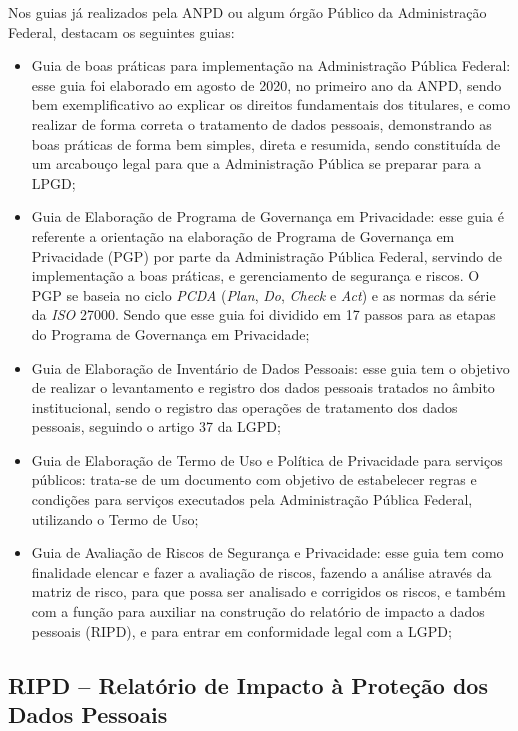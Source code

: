\documentclass[
	12pt,				%
	openright,			%
	oneside,			%
	a4paper,			%
	english,			%
	french,				%
	spanish,			%
	brazil,				%
	]{abntex2}
\begin{document}
Nos guias já realizados pela ANPD ou algum órgão Público da Administração Federal, destacam os seguintes guias:
\begin{itemize}
\item Guia de boas práticas para implementação na Administração Pública Federal: esse guia foi elaborado em agosto de 2020, no primeiro ano da ANPD, sendo bem exemplificativo ao explicar os direitos fundamentais dos titulares, e como realizar de forma correta o tratamento de dados pessoais, demonstrando as boas práticas de forma bem simples, direta e resumida, sendo constituída de um arcabouço legal para que a Administração Pública se preparar para a LPGD; 
\item Guia de Elaboração de Programa de Governança em Privacidade: esse guia é referente a orientação na elaboração de Programa de Governança em Privacidade (PGP) por parte da Administração Pública Federal, servindo de implementação a boas práticas, e gerenciamento de segurança e riscos. O PGP se baseia no ciclo \textit{PCDA} (\textit{Plan}, \textit{Do}, \textit{Check} e \textit{Act}) e as normas da série da \textit{ISO} 27000. Sendo que esse guia foi dividido em 17 passos para as etapas do Programa de Governança em Privacidade;
\item Guia de Elaboração de Inventário de Dados Pessoais: esse guia tem o objetivo de realizar o levantamento e registro dos dados pessoais tratados no âmbito institucional, sendo o registro das operações de tratamento dos dados pessoais, seguindo o artigo 37 da LGPD;
\item Guia de Elaboração de Termo de Uso e Política de Privacidade para serviços públicos: trata-se de um documento com objetivo de estabelecer regras e condições para serviços executados pela Administração Pública Federal, utilizando o Termo de Uso;
\item Guia de Avaliação de Riscos de Segurança e Privacidade: esse guia tem como finalidade elencar e fazer a avaliação de riscos, fazendo a análise através da matriz de risco, para que possa ser analisado e corrigidos os riscos, e também com a função para auxiliar na construção do relatório de impacto a dados pessoais (RIPD), e para entrar em conformidade legal com a LGPD;
\end{itemize}

\subsection{ RIPD – Relatório de Impacto à Proteção dos Dados Pessoais  }
\end{document}
